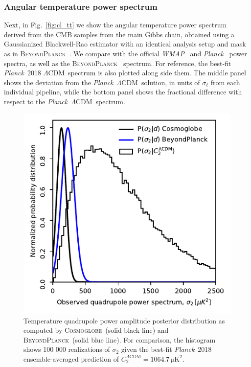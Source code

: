 \documentclass[twocolumn]{../../common/aa}
\def\WMAP{\emph{WMAP}}
\def\planck{\emph{Planck}}
\def\Planck{\emph{Planck}}
\def\LCDM{$\Lambda$CDM}
\newcommand{\bp}{\textsc{BeyondPlanck}}
\newcommand{\cosmoglobe}{\textsc{Cosmoglobe}}
\begin{document}
\subsubsection{Angular temperature power spectrum}
\label{sec:cls}



Next, in Fig.~\ref{fig:cl_tt} we show the angular temperature power spectrum derived from the CMB samples from the main Gibbs chain, obtained using a Gaussianized Blackwell-Rao estimator \citep{chu2005,rudjord:2009} with an identical analysis setup and mask as in \bp\ \citep{bp11}. We compare with the official \WMAP\ \citep{hinshaw2012} and \planck\ \citep{planck2016-l05} power spectra, as well as the \bp\ \citep{bp11} spectrum. For reference, the best-fit \planck\ 2018 \LCDM\ spectrum is also plotted along side them. The middle panel shows the deviation from the \planck\ \LCDM\ solution, in units of $\sigma_\ell$ from each individual pipeline, while the bottom panel shows the fractional difference with respect to the \planck\ \LCDM\ spectrum. 

\begin{figure}[t]
	\includegraphics[width=\columnwidth]{figures/WMAP_P_sig_d_c.pdf}
	\caption{Temperature quadrupole power amplitude posterior distribution as computed by \cosmoglobe\ (solid black line) and \bp\ (solid blue line). For comparison, the histogram shows 100 000 realizations of $\sigma_2$ given the best-fit \Planck\ 2018 ensemble-averaged prediction of ${C_2^{\Lambda \mathrm{CDM}} = 1064.7\,\mathrm{\mu K^2}}$.}
	\label{fig:sigma_2_hist}
\end{figure}
\end{document}
